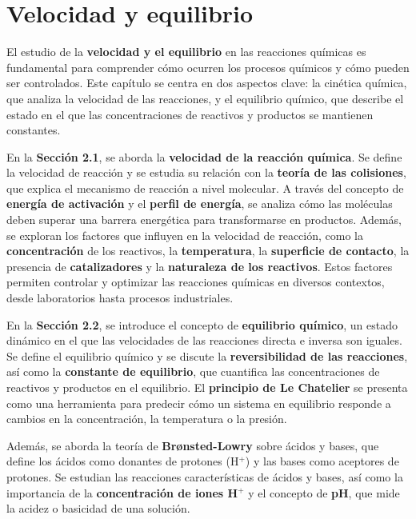 \chapter{Velocidad y equilibrio}

El estudio de la \textbf{velocidad y el equilibrio} en las reacciones químicas es fundamental para comprender cómo ocurren los procesos químicos y cómo pueden ser controlados. Este capítulo se centra en dos aspectos clave: la cinética química, que analiza la velocidad de las reacciones, y el equilibrio químico, que describe el estado en el que las concentraciones de reactivos y productos se mantienen constantes.

En la \textbf{Sección 2.1}, se aborda la \textbf{velocidad de la reacción química}. Se define la velocidad de reacción y se estudia su relación con la \textbf{teoría de las colisiones}, que explica el mecanismo de reacción a nivel molecular. A través del concepto de \textbf{energía de activación} y el \textbf{perfil de energía}, se analiza cómo las moléculas deben superar una barrera energética para transformarse en productos. Además, se exploran los factores que influyen en la velocidad de reacción, como la \textbf{concentración} de los reactivos, la \textbf{temperatura}, la \textbf{superficie de contacto}, la presencia de \textbf{catalizadores} y la \textbf{naturaleza de los reactivos}. Estos factores permiten controlar y optimizar las reacciones químicas en diversos contextos, desde laboratorios hasta procesos industriales.

En la \textbf{Sección 2.2}, se introduce el concepto de \textbf{equilibrio químico}, un estado dinámico en el que las velocidades de las reacciones directa e inversa son iguales. Se define el equilibrio químico y se discute la \textbf{reversibilidad de las reacciones}, así como la \textbf{constante de equilibrio}, que cuantifica las concentraciones de reactivos y productos en el equilibrio. El \textbf{principio de Le Chatelier} se presenta como una herramienta para predecir cómo un sistema en equilibrio responde a cambios en la concentración, la temperatura o la presión.

Además, se aborda la teoría de \textbf{Brønsted-Lowry} sobre ácidos y bases, que define los ácidos como donantes de protones (H$^+$) y las bases como aceptores de protones. Se estudian las reacciones características de ácidos y bases, así como la importancia de la \textbf{concentración de iones H$^+$} y el concepto de \textbf{pH}, que mide la acidez o basicidad de una solución.

